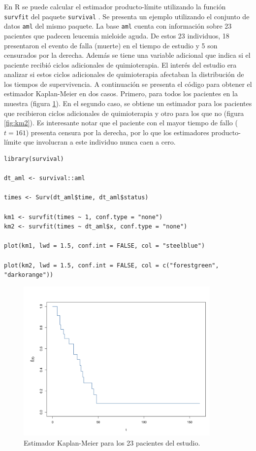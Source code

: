 \documentclass[11pt,a4paper]{article}
\begin{document}
 En R se puede calcular el estimador producto-límite utilizando la función \texttt{survfit} del paquete \texttt{survival} \citep{survival-book}. Se presenta un ejemplo utilizando el conjunto de datos \texttt{aml} del mismo paquete. La base \texttt{aml} cuenta con información sobre 23 pacientes que padecen leucemia mieloide aguda. De estos 23 individuos, 18 presentaron el evento de falla (muerte) en el tiempo de estudio y 5 son censurados por la derecha. Además se tiene una variable adicional que indica si el paciente recibió ciclos adicionales de quimioterapia. El interés del estudio era analizar si estos ciclos adicionales de quimioterapia afectaban la distribución de los tiempos de supervivencia. A continuación se presenta el código para obtener el estimador Kaplan-Meier en dos casos. Primero, para todos los pacientes en la muestra (figura \ref{fig:km1}). En el segundo caso, se obtiene un estimador para los pacientes que recibieron ciclos adicionales de quimioterapia y otro para los que no (figura \ref{fig:km2}). Es interesante notar que el paciente con el mayor tiempo de fallo ($t = 161$) presenta censura por la derecha, por lo que los estimadores producto-límite que involucran a este individuo nunca caen a cero.\\

\begin{lstlisting}
library(survival)

dt_aml <- survival::aml

times <- Surv(dt_aml$time, dt_aml$status)

km1 <- survfit(times ~ 1, conf.type = "none")
km2 <- survfit(times ~ dt_aml$x, conf.type = "none")

plot(km1, lwd = 1.5, conf.int = FALSE, col = "steelblue")

plot(km2, lwd = 1.5, conf.int = FALSE, col = c("forestgreen", "darkorange"))
\end{lstlisting}\leavevmode\newline

 \begin{figure}[h]
\centering\includegraphics[width=10cm]{km1.png}
\caption{Estimador Kaplan-Meier para los 23 pacientes del estudio.}
\label{fig:km1}
\end{figure}
\end{document}
